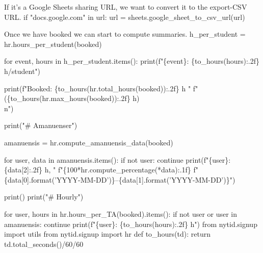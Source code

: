 If it's a Google Sheets sharing URL, we want to convert it to the export-CSV 
URL.
\nwenddocs{}\endmoddef\nwstartdeflinemarkup{}\nwenddeflinemarkup
if "docs.google.com" in url:
  url = sheets.google_sheet_to_csv_url(url)
\nwendcode{}\nwdocspar

Once we have {\Tt{}booked\nwendquote} we can start to compute summaries.
\nwenddocs{}\endmoddef\nwstartdeflinemarkup{}\nwenddeflinemarkup
h_per_student = hr.hours_per_student(booked)

for event, hours in h_per_student.items():
    print(f"\{event\}: \{to_hours(hours):.2f\} h/student")

print(f"Booked: \{to_hours(hr.total_hours(booked)):.2f\} h "
        f"(\{to_hours(hr.max_hours(booked)):.2f\} h)\\n")

print("# Amanuenser")

amanuensis = hr.compute_amanuensis_data(booked)

for user, data in amanuensis.items():
    if not user:
        continue
    print(f"\{user\}: \{data[2]:.2f\} h, "
          f"\{100*hr.compute_percentage(*data):.1f\}%
          f"\{data[0].format('YYYY-MM-DD')\}--\{data[1].format('YYYY-MM-DD')\}")

print()
print("# Hourly")

for user, hours in hr.hours_per_TA(booked).items():
  if not user or user in amanuensis:
      continue
  print(f"\{user\}: \{to_hours(hours):.2f\} h")
\nwendcode{}\plusendmoddef\nwstartdeflinemarkup{}\nwenddeflinemarkup
from nytid.signup import utils
from nytid.signup import hr
\nwendcode{}\endmoddef\nwstartdeflinemarkup{}\nwenddeflinemarkup
def to_hours(td):
    return td.total_seconds()/60/60
\nwendcode{}\nwdocspar


